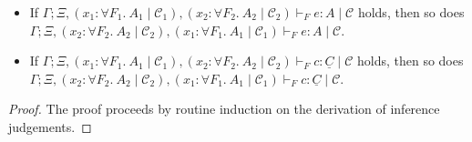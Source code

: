 \documentclass{LMCS}
\newcommand{\fra}[1]{\forall #1 .\ }
\newcommand{\C}{\underline{C}}
\newcommand{\ctx}{\Gamma}
\newcommand{\pctx}{\Xi}
\newcommand{\ent}[1][]{\vdash_{#1}}
\newcommand{\T}{\mathrel{:}}
\newcommand{\while}{\mid}
\newcommand{\cstr}{\mathcal{C}}
\begin{document}
\begin{lem}[Exchange]
\label{lem:exchange}
\hfill
\begin{itemize}
\item
  If $\ctx; \pctx, (x_1 \T \fra{F_1} A_1 \while \cstr_1), (x_2 \T \fra{F_2} A_2 \while \cstr_2) \ent[F] e \T A \while \cstr$ holds,
  then so does $\ctx; \pctx, (x_2 \T \fra{F_2} A_2 \while \cstr_2), (x_1 \T \fra{F_1} A_1 \while \cstr_1) \ent[F] e \T A \while \cstr$.
\item
  If $\ctx; \pctx, (x_1 \T \fra{F_1} A_1 \while \cstr_1), (x_2 \T \fra{F_2} A_2 \while \cstr_2) \ent[F] c \T \C \while \cstr$ holds,
  then so does $\ctx; \pctx, (x_2 \T \fra{F_2} A_2 \while \cstr_2), (x_1 \T \fra{F_1} A_1 \while \cstr_1) \ent[F] c \T \C \while \cstr$.
\end{itemize}
\end{lem}
\begin{proof}
The proof proceeds by routine induction on the derivation of inference judgements.
\end{proof}
\end{document}
